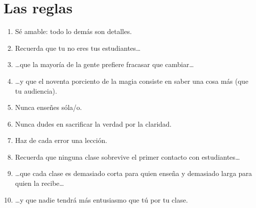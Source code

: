 \chapter*{Las reglas}

\begin{enumerate}

\item Sé amable: todo lo demás son detalles.\\

\item Recuerda que tu no eres tus estudiantes{\ldots}\\

\item {\ldots}que la mayoría de la gente prefiere fracasar que cambiar{\ldots}\\

\item {\ldots}y que el noventa porciento de la magia consiste en saber una cosa más (que tu audiencia).\\

\item Nunca enseñes sóla/o.\\

\item Nunca dudes en sacrificar la verdad por la claridad.\\

\item Haz de cada error una lección.\\

\item Recuerda que ninguna clase sobrevive el primer contacto con estudiantes{\ldots}\\

\item {\ldots}que cada clase es demasiado corta para quien enseña y demasiado larga para quien la recibe{\ldots}\\

\item {\ldots}y que nadie tendrá más entusiasmo que tú por tu clase.

\end{enumerate}

